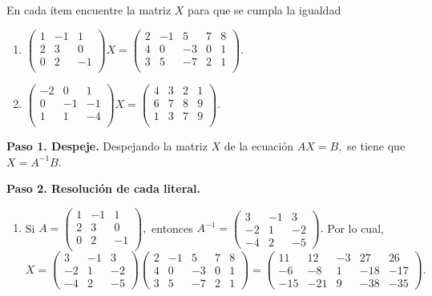 \begin{prob} 
En cada ítem encuentre la matriz $X$ para que se cumpla la igualdad 

\begin{enumerate}[$a)$]
\item $\left( \begin{array}{ccc}
1&-1&1\\
2&3&0\\
0&2&-1\\
\end{array} \right) X= \left( \begin{array}{ccccc}
2&-1&5&7&8\\
4&0&-3&0&1\\
3&5&-7&2&1\\
\end{array} \right).$ 

\item $\left( \begin{array}{ccc}
-2&0&1\\
0&-1&-1\\
1&1&-4\\
\end{array} \right) X= \left( \begin{array}{cccc}
4&3&2&1\\
6&7&8&9\\
1&3&7&9\\
\end{array} \right).$ 
\end{enumerate}

\begin{myproof}
\textbf{Paso 1. Despeje.} Despejando la matriz $X$ de la ecuación $AX=B,$ se tiene que $X=A^{-1}B.$

\textbf{Paso 2. Resolución de cada literal.}
\begin{enumerate}[$(a)$]
\item Si $A=\left( \begin{array}{ccc}
1&-1&1\\
2&3&0\\
0&2&-1\\
\end{array} \right),$ entonces $A^{-1}=\begin{pmatrix}
3 & -1 & 3 \\
-2 & 1 & -2 \\
-4 & 2 & -5
\end{pmatrix}.$ Por lo cual, 
$$X=\begin{pmatrix}
3 & -1 & 3 \\
-2 & 1 & -2 \\
-4 & 2 & -5
\end{pmatrix}\begin{pmatrix}
2 & -1 & 5 & 7 & 8 \\
4 & 0 & -3 & 0 & 1 \\
3 & 5 & -7 & 2 & 1
\end{pmatrix}=\boxed{\begin{pmatrix}
11 & 12 & -3 & 27 & 26 \\
-6 & -8 & 1 & -18 & -17 \\
-15 & -21 & 9 & -38 & -35
\end{pmatrix}}.$$


\end{enumerate}
\end{myproof}
\end{prob}
